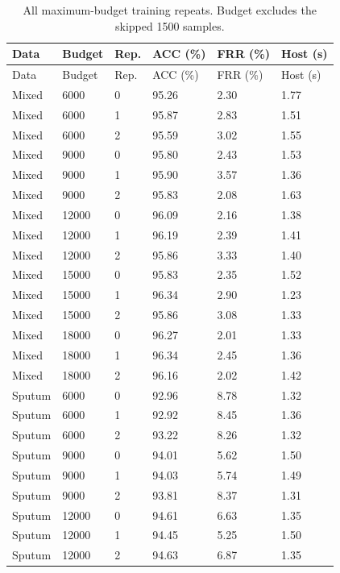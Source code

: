 \begin{longtable}{llllll}
\caption{All maximum-budget training repeats. Budget excludes the skipped 1500 samples.}\label{tab:s_budget}\\
\toprule
Data & Budget & Rep. & ACC (\%) & FRR (\%) & Host (s)\\\midrule\endfirsthead
\toprule
Data & Budget & Rep. & ACC (\%) & FRR (\%) & Host (s)\\\midrule\endhead
\bottomrule\endfoot
Mixed & 6000 & 0 & 95.26 & 2.30 & 1.77\\
Mixed & 6000 & 1 & 95.87 & 2.83 & 1.51\\
Mixed & 6000 & 2 & 95.59 & 3.02 & 1.55\\
Mixed & 9000 & 0 & 95.80 & 2.43 & 1.53\\
Mixed & 9000 & 1 & 95.90 & 3.57 & 1.36\\
Mixed & 9000 & 2 & 95.83 & 2.08 & 1.63\\
Mixed & 12000 & 0 & 96.09 & 2.16 & 1.38\\
Mixed & 12000 & 1 & 96.19 & 2.39 & 1.41\\
Mixed & 12000 & 2 & 95.86 & 3.33 & 1.40\\
Mixed & 15000 & 0 & 95.83 & 2.35 & 1.52\\
Mixed & 15000 & 1 & 96.34 & 2.90 & 1.23\\
Mixed & 15000 & 2 & 95.86 & 3.08 & 1.33\\
Mixed & 18000 & 0 & 96.27 & 2.01 & 1.33\\
Mixed & 18000 & 1 & 96.34 & 2.45 & 1.36\\
Mixed & 18000 & 2 & 96.16 & 2.02 & 1.42\\
Sputum & 6000 & 0 & 92.96 & 8.78 & 1.32\\
Sputum & 6000 & 1 & 92.92 & 8.45 & 1.36\\
Sputum & 6000 & 2 & 93.22 & 8.26 & 1.32\\
Sputum & 9000 & 0 & 94.01 & 5.62 & 1.50\\
Sputum & 9000 & 1 & 94.03 & 5.74 & 1.49\\
Sputum & 9000 & 2 & 93.81 & 8.37 & 1.31\\
Sputum & 12000 & 0 & 94.61 & 6.63 & 1.35\\
Sputum & 12000 & 1 & 94.45 & 5.25 & 1.50\\
Sputum & 12000 & 2 & 94.63 & 6.87 & 1.35\\
\end{longtable}
